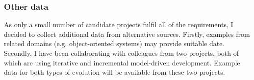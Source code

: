 % 
% 
% 
% 
% 
% 

\subsubsection{Other data} %
\label{ssub:other_data}
As only a small number of candidate projects fulfil all of the requirements, I decided to collect additional data from alternative sources. Firstly, examples from related domains (e.g. object-oriented systems) may provide suitable date. Secondly, I have been collaborating with colleagues from two projects, both of which are using iterative and incremental model-driven development. Example data for both types of evolution will be available from these two projects.

